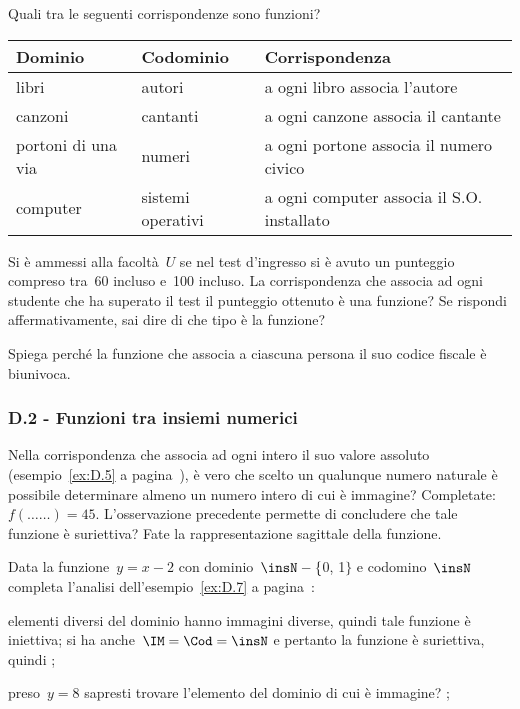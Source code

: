 \begin{esercizio}
 \label{ese:D.4}
Quali tra le seguenti corrispondenze sono funzioni?
\begin{center}
 \begin{tabular}{*3{l}}
 \toprule
  Dominio & Codominio & Corrispondenza\\
\midrule
libri & autori & a ogni libro associa l'autore\\
canzoni & cantanti & a ogni canzone associa il cantante\\
portoni di una via & numeri & a ogni portone associa il numero civico\\
computer & sistemi operativi & a ogni computer associa il S.O. installato\\
\bottomrule
 \end{tabular}
\end{center}
\end{esercizio}

\begin{esercizio}
 \label{ese:D.5}
Si è ammessi alla facoltà~$U$ se nel test
d'ingresso si è avuto un punteggio compreso tra~60
incluso e~100 incluso. La corrispondenza che associa ad ogni studente
che ha superato il test il punteggio ottenuto è una funzione? Se rispondi
affermativamente, sai dire di che tipo è la funzione?
\end{esercizio}


\begin{esercizio}
 \label{ese:D.6}
Spiega perché la funzione che associa a ciascuna
persona il suo codice fiscale è biunivoca.
\end{esercizio}

\subsubsection*{D.2 - Funzioni tra insiemi numerici}
\begin{esercizio}
 \label{ese:D.7}
Nella corrispondenza che associa ad ogni intero il suo valore assoluto (esempio~\ref{ex:D.5} a pagina~\pageref{ex:D.5}), è vero che scelto un qualunque numero naturale è
possibile determinare almeno un numero intero di cui è immagine?
Completate:~$f(\ldots\ldots) = 45.$
L'osservazione precedente permette di concludere che
tale funzione è suriettiva?
Fate la rappresentazione sagittale della funzione.
\end{esercizio}

\pagebreak

\begin{esercizio}
 \label{ese:D.8}
Data la funzione~$y=x-2$ con dominio~$\insN-\{$0, 1$\}$ e codomino~$\insN$ completa l'analisi dell'esempio~\ref{ex:D.7} a pagina~\pageref{ex:D.7}:
\begin{enumeratea}
\item elementi diversi del dominio hanno immagini diverse, quindi tale funzione è iniettiva;
si ha anche~$\IM =\Cod= \insN$ e pertanto la funzione è suriettiva, quindi \dotfill;
\item preso~$y = 8$ sapresti trovare l'elemento del dominio di cui è immagine? \dotfill;
\end{enumeratea}
\end{esercizio}

